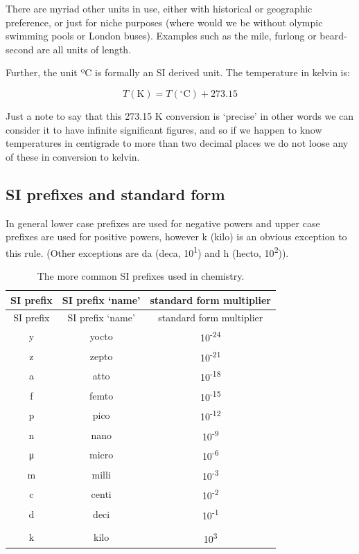 \documentclass[
]{book}
\begin{document}
There are myriad other units in use, either with historical or geographic preference, or just for niche purposes (where would we be without olympic swimming pools or London buses). Examples such as the mile, furlong or beard-second are all units of length.

Further, the unit ºC is formally an SI derived unit. The temperature in kelvin is:

{
\begin{equation*}
T (\textrm{K}) = T (^\circ \textrm{C}) + 273.15
\end{equation*}
}

Just a note to say that this 273.15 K conversion is `precise' in other words we can consider it to have infinite significant figures, and so if we happen to know temperatures in centigrade to more than two decimal places we do not loose any of these in conversion to kelvin.

\hypertarget{si-prefixes-and-standard-form}{%
\subsection{SI prefixes and standard form}\label{si-prefixes-and-standard-form}}

In general lower case prefixes are used for negative powers and upper case prefixes are used for positive powers, however k (kilo) is an obvious exception to this rule. (Other exceptions are da (deca, 10\textsuperscript{1}) and h (hecto, 10\textsuperscript{2})).

\begin{longtable}[]{@{}ccc@{}}
\caption{\label{tab:SIprefix} The more common SI prefixes used in chemistry.}\tabularnewline
\toprule
SI prefix & SI prefix `name' & standard form multiplier \\
\midrule
\endfirsthead
\toprule
SI prefix & SI prefix `name' & standard form multiplier \\
\midrule
\endhead
y & yocto & 10\textsuperscript{-24} \\
z & zepto & 10\textsuperscript{-21} \\
a & atto & 10\textsuperscript{-18} \\
f & femto & 10\textsuperscript{-15} \\
p & pico & 10\textsuperscript{-12} \\
n & nano & 10\textsuperscript{-9} \\
μ & micro & 10\textsuperscript{-6} \\
m & milli & 10\textsuperscript{-3} \\
c & centi & 10\textsuperscript{-2} \\
d & deci & 10\textsuperscript{-1} \\
& & \\
k & kilo & 10\textsuperscript{3} \\
\bottomrule
\end{longtable}
\end{document}
